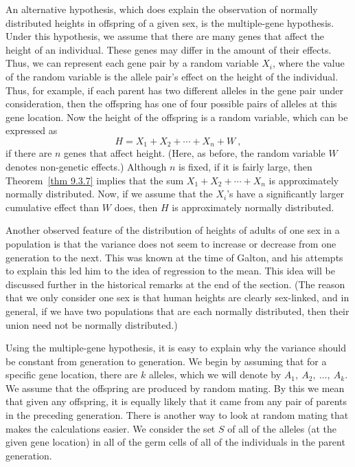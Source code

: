 An alternative hypothesis, which does explain the observation of normally distributed heights in
offspring of a given sex, is the multiple-gene hypothesis. 
Under this hypothesis, we assume that there are many genes that affect the height of an
individual.  These genes may differ in the amount of their effects.  Thus, we can represent each
gene pair by a random variable $X_i$, where the value of the random variable is the allele pair's
effect on the height of the individual.  Thus, for example, if each parent has two different
alleles in the gene pair under consideration, then the offspring has one of four possible pairs
of alleles at this gene location.  Now the height of the offspring is a random variable, which
can be expressed as
$$H = X_1 + X_2 + \cdots + X_n + W\ ,$$
if there are $n$ genes that affect height.  (Here, as before, the random variable $W$ denotes
non-genetic effects.)  Although $n$ is fixed, if it is fairly large, then Theorem~\ref{thm 9.3.7}
implies that the sum $X_1 + X_2 + \cdots + X_n$ is approximately normally distributed.  Now, if we
assume that the $X_i$'s have a significantly larger cumulative effect than $W$ does, then $H$ is
approximately normally distributed.
\par
Another observed feature of the distribution of heights of adults of one sex in a population is
that the variance does not seem to increase or decrease from one generation to the next.
 This was known at the time of Galton, and his attempts to explain this led him to the idea of regression to
the mean.  This idea will be discussed further in the historical remarks at the end of the section.    
(The reason that we only consider one sex is that human heights are clearly sex-linked, and in general, if
we have two populations that are each normally distributed, then their union need not be normally
distributed.)
\par
Using the multiple-gene hypothesis, it is easy to explain why the variance should be constant
from generation to generation.  We begin by assuming that for a specific gene location, there are
$k$ alleles, which we will denote by $A_1,\ A_2,\ \ldots,\ A_k$.  We assume that the offspring are
produced by random mating.  By this we mean that given any offspring, it is equally likely that it
came from any pair of parents in the preceding generation.  There is another way to look at random
mating that makes the calculations easier.  We consider the set $S$ of all of the alleles (at the
given gene location) in all of the germ cells of all of the individuals in the parent generation. 
